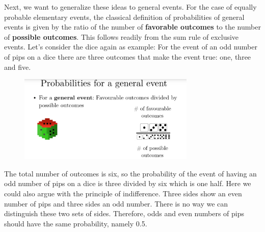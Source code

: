 \documentclass[12pt, a4paper]{scrartcl}
\begin{document}
Next, we want to generalize these ideas to general events. For the case of equally probable elementary events, the classical definition of probabilities of general events is given by the ratio of the number of \textbf{favorable outcomes} to the number of \textbf{possible outcomes}. This follows readily from the sum rule of exclusive events. %
Let’s consider the dice again as example: For the event of an odd number of pips on a dice there are three outcomes that make the event true: one, three and five.
\begin{figure}[H]
	\centering
	\includegraphics[width=0.75\textwidth]{1_5.png}
\end{figure}
The total number of outcomes is six, so the probability of the event of having an odd number of pips on a dice is three divided by six which is one half. Here we could also argue with the principle of indifference. Three sides show an even number of pips and three sides an odd number. There is no way we can distinguish these two sets of sides. Therefore, odds and even numbers of pips should have the same probability, namely 0.5.\\

\\
\end{document}
